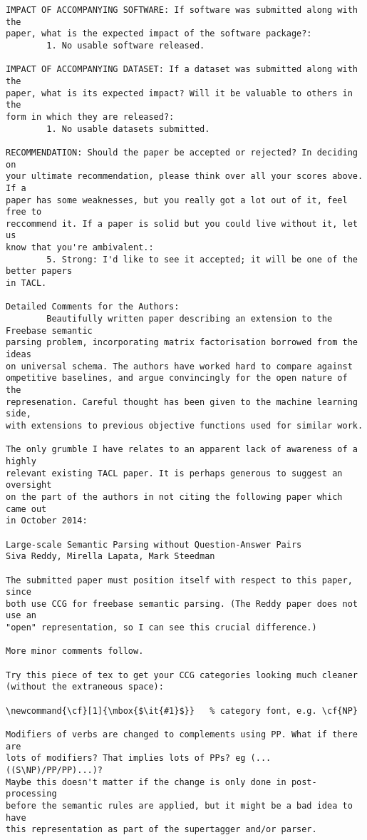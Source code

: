 \documentclass{article}[11pt,oneside]
\begin{document}
\begin{verbatim}
IMPACT OF ACCOMPANYING SOFTWARE: If software was submitted along with the
paper, what is the expected impact of the software package?:
        1. No usable software released.

IMPACT OF ACCOMPANYING DATASET: If a dataset was submitted along with the
paper, what is its expected impact? Will it be valuable to others in the
form in which they are released?:
        1. No usable datasets submitted.

RECOMMENDATION: Should the paper be accepted or rejected? In deciding on
your ultimate recommendation, please think over all your scores above. If a
paper has some weaknesses, but you really got a lot out of it, feel free to
reccommend it. If a paper is solid but you could live without it, let us
know that you're ambivalent.:
        5. Strong: I'd like to see it accepted; it will be one of the better papers
in TACL.

Detailed Comments for the Authors:
        Beautifully written paper describing an extension to the Freebase semantic
parsing problem, incorporating matrix factorisation borrowed from the ideas
on universal schema. The authors have worked hard to compare against
ompetitive baselines, and argue convincingly for the open nature of the
represenation. Careful thought has been given to the machine learning side,
with extensions to previous objective functions used for similar work.

The only grumble I have relates to an apparent lack of awareness of a highly
relevant existing TACL paper. It is perhaps generous to suggest an oversight
on the part of the authors in not citing the following paper which came out
in October 2014:

Large-scale Semantic Parsing without Question-Answer Pairs
Siva Reddy, Mirella Lapata, Mark Steedman

The submitted paper must position itself with respect to this paper, since
both use CCG for freebase semantic parsing. (The Reddy paper does not use an
"open" representation, so I can see this crucial difference.)

More minor comments follow.

Try this piece of tex to get your CCG categories looking much cleaner
(without the extraneous space):

\newcommand{\cf}[1]{\mbox{$\it{#1}$}}   % category font, e.g. \cf{NP}

Modifiers of verbs are changed to complements using PP. What if there are
lots of modifiers? That implies lots of PPs? eg (...((S\NP)/PP/PP)...)?
Maybe this doesn't matter if the change is only done in post-processing
before the semantic rules are applied, but it might be a bad idea to have
this representation as part of the supertagger and/or parser.


\end{verbatim}
\end{document}

